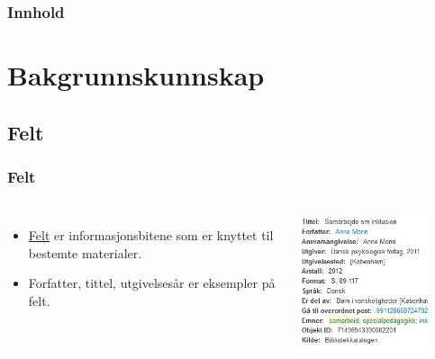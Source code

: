 
\frame{\titlepage}
\begin{frame}
  \frametitle{Innhold}
  \tableofcontents
\end{frame}

\section{Bakgrunnskunnskap}
\subsection{Felt}
\begin{frame}
  \frametitle{Felt}
  \begin{columns}
    \begin{itemize}
    \item \href{https://en.wikipedia.org/wiki/Field_(computer_science)}{Felt} er informasjonsbitene som er knyttet til bestemte materialer.
    \item \alert{Forfatter}, \alert{tittel}, \alert{utgivelsesår} er eksempler på felt.
    \end{itemize}

    \centering
    \includegraphics[width=0.8\textwidth]{../media/felt-i-oria.png}
  \end{columns}
\end{frame}

